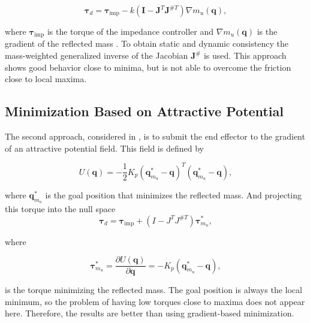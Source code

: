\begin{equation}
\mathbf{\tau}_d = \mathbf{\tau}_\mathrm{imp} - k (\mathbf{I} - \mathbf{J}^T \mathbf{J}^{\#T}) \nabla m_u(\mathbf{q}), \label{eq:gbm_nico}
\end{equation}

where $\mathbf{\tau}_\mathrm{imp}$ is the torque of the impedance controller and $\nabla m_u(\mathbf{q})$ is the gradient of the reflected mass \cite{paper_iros2017}. To obtain static and dynamic consistency \cite{khatib1995} the mass-weighted generalized inverse of the Jacobian $\mathbf{J}^{\#}$ is used.
This approach shows good behavior close to minima, but is not able to overcome the friction close to local maxima. 




\subsection{Minimization Based on Attractive Potential}
\label{subsec:minim_potential_intro}


The second approach, considered in \cite{paper_iros2017}, is to submit the end effector to the gradient of an attractive potential field. This field is defined by 


\begin{equation}
U(\mathbf{q}) = - \frac{1}{2} K_p (\mathbf{q}_{m_u}^\ast - \mathbf{q})^T (\mathbf{q}_{m_u}^\ast - \mathbf{q}), \label{eq:potential_intro}
\end{equation}

where $\mathbf{q}_{m_u}^\ast$ is the goal position that minimizes the reflected mass. And projecting this torque into the null space
\begin{equation}
\mathbf{\tau}_d = \mathbf{\tau}_\mathrm{imp} + (I - J^T J^{\#T}) \mathbf{\tau}_{m_u}^\ast, \label{eq:potential_controller_intro}
\end{equation}

where 

\begin{equation}
\mathbf{\tau}_{m_u}^\ast = \frac{\partial {U(\mathbf{q})}}{\partial {\mathbf{q}}} = - K_p (\mathbf{q}_{m_u}^\ast - \mathbf{q}),
\label{eq:torque_pot_intro}
\end{equation}

is the torque minimizing the reflected mass.
The goal position is always the local minimum, so the problem of having low torques close to maxima does not appear here. Therefore, the results are better than using gradient-based minimization.


